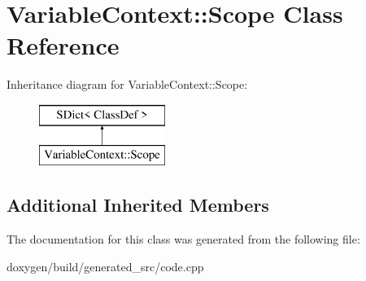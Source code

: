\hypertarget{class_variable_context_1_1_scope}{}\section{Variable\+Context\+::Scope Class Reference}
\label{class_variable_context_1_1_scope}
Inheritance diagram for Variable\+Context\+::Scope\+:\begin{figure}[H]
\begin{center}
\leavevmode
\includegraphics[height=2.000000cm]{class_variable_context_1_1_scope}
\end{center}
\end{figure}
\subsection*{Additional Inherited Members}


The documentation for this class was generated from the following file\+:\begin{DoxyCompactItemize}
\item 
doxygen/build/generated\+\_\+src/code.\+cpp\end{DoxyCompactItemize}
